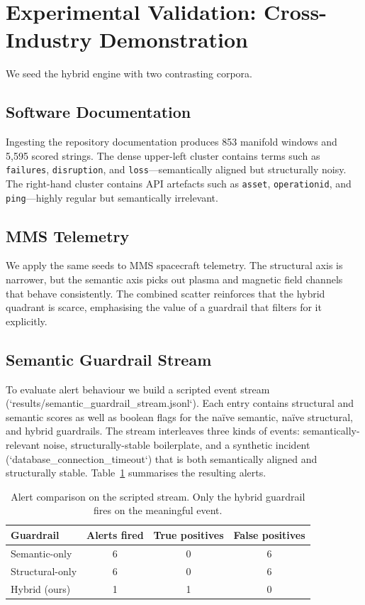 \documentclass[11pt]{article}
\begin{document}
\section{Experimental Validation: Cross-Industry Demonstration}
We seed the hybrid engine with two contrasting corpora.

\subsection{Software Documentation}
Ingesting the repository documentation produces 853 manifold windows and 5,595
scored strings. The dense upper-left cluster contains terms such as
\texttt{failures}, \texttt{disruption}, and \texttt{loss}---semantically aligned
but structurally noisy. The right-hand cluster contains API artefacts such as
\texttt{asset}, \texttt{operationid}, and \texttt{ping}---highly regular but
semantically irrelevant.

\subsection{MMS Telemetry}
We apply the same seeds to MMS spacecraft telemetry. The structural axis is
narrower, but the semantic axis picks out plasma and magnetic field channels that
behave consistently. The combined scatter reinforces that the hybrid quadrant is
scarce, emphasising the value of a guardrail that filters for it explicitly.

\subsection{Semantic Guardrail Stream}
To evaluate alert behaviour we build a scripted event stream
(`results/semantic_guardrail_stream.jsonl`). Each entry contains structural and
semantic scores as well as boolean flags for the naïve semantic, naïve
structural, and hybrid guardrails. The stream interleaves three kinds of events:
semantically-relevant noise, structurally-stable boilerplate, and a synthetic
incident (`database\_connection\_timeout`) that is both semantically aligned and
structurally stable. Table~\ref{tab:alerts} summarises the resulting alerts.
\begin{table}[h]
  \centering
  \begin{tabular}{lccc}
    \toprule
    Guardrail & Alerts fired & True positives & False positives \\
    \midrule
    Semantic-only & 6 & 0 & 6 \\
    Structural-only & 6 & 0 & 6 \\
    Hybrid (ours) & 1 & 1 & 0 \\
    \bottomrule
  \end{tabular}
  \caption{Alert comparison on the scripted stream. Only the hybrid guardrail
           fires on the meaningful event.}
  \label{tab:alerts}
\end{table}
\end{document}
